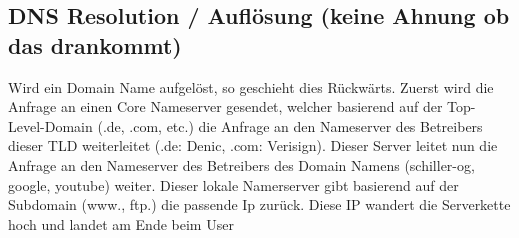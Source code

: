 \documentclass{article}
\begin{document}
\subsection*{DNS Resolution / Auflösung (keine Ahnung ob das drankommt)}
Wird ein Domain Name aufgelöst, so geschieht dies Rückwärts. Zuerst wird die Anfrage an einen Core Nameserver gesendet, welcher
basierend auf der Top-Level-Domain (.de, .com, etc.) die Anfrage an den Nameserver des Betreibers dieser TLD weiterleitet
(.de: Denic, .com: Verisign). Dieser Server leitet nun die Anfrage an den Nameserver des Betreibers des Domain Namens
(schiller-og, google, youtube) weiter. Dieser lokale Namerserver gibt basierend auf der Subdomain (www., ftp.) die passende
Ip zurück. Diese IP wandert die Serverkette hoch und landet am Ende beim User
\end{document}

